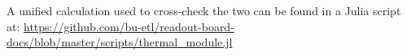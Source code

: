 \documentclass[11pt]{article}
\begin{document}
A unified calculation used to cross-check the two can be found in a Julia script at:
\url{https://github.com/bu-etl/readout-board-docs/blob/master/scripts/thermal_module.jl}

%
%
\end{document}
